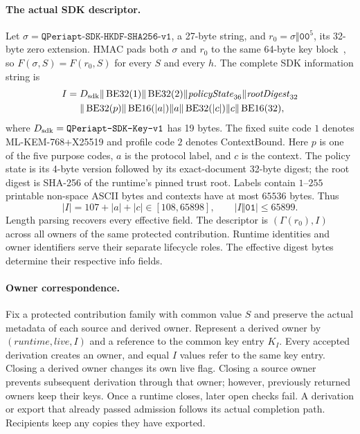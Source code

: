 \documentclass[pdflatex]{sn-jnl}
\theoremstyle{thmstyleone}
\theoremstyle{thmstylethree}
\theoremstyle{thmstyletwo}
\begin{document}
\paragraph{The actual SDK descriptor.}
Let $\sigma=\texttt{QPeriapt-SDK-HKDF-SHA256-v1}$, a 27-byte string, and
$r_0=\sigma\Vert\mathtt{00}^5$, its 32-byte zero extension. HMAC pads both $\sigma$ and $r_0$ to the same
64-byte key block~\cite{rfc2104}, so $F(\sigma,S)=F(r_0,S)$ for every $S$ and every $h$.
The complete SDK information string is
\begin{equation}
\begin{split}
 I={}&D_{\rm sdk}\Vert\operatorname{BE32}(1)
 \Vert\operatorname{BE32}(2)\Vert\mathit{policyState}_{36}
 \Vert\mathit{rootDigest}_{32}\\
 &\Vert\operatorname{BE32}(p)
 \Vert\operatorname{BE16}(|a|)\Vert a
 \Vert\operatorname{BE32}(|c|)\Vert c
 \Vert\operatorname{BE16}(32),
\end{split}
 \label{eq:sdk-purpose-info}
\end{equation}
where $D_{\rm sdk}=\texttt{QPeriapt-SDK-Key-v1}$ has 19 bytes. The fixed
suite code $1$ denotes ML-KEM-768+X25519 and profile code $2$ denotes
ContextBound. Here $p$ is one
of the five purpose codes, $a$ is the protocol label, and $c$ is the context.
The policy state is its 4-byte version followed by its exact-document
32-byte digest; the root digest is SHA-256 of the runtime's pinned trust
root. Labels contain $1$--$255$ printable non-space ASCII bytes and contexts
have at most $65536$ bytes. Thus
\[
 |I|=107+|a|+|c|\in[108,65898],\qquad |I\Vert\mathtt{01}|\le65899.
\]
Length parsing recovers every effective field. The descriptor is
$(\Gamma(r_0),I)$ across all owners of the same protected contribution.
Runtime identities and owner identifiers serve their separate lifecycle
roles. The effective digest bytes determine their respective info fields.

\paragraph{Owner correspondence.}
Fix a protected contribution family with common value $S$ and preserve the
actual metadata of each source and derived owner. Represent a derived owner
by $(\mathit{runtime},\mathit{live},I)$ and a reference to the common key
entry $K_I$. Every accepted derivation creates an owner, and equal $I$ values refer
to the same key entry. Closing a derived owner changes its own live
flag. Closing a source owner prevents subsequent derivation through
that owner; however, previously returned owners keep their keys. Once a
runtime closes, later open checks fail. A derivation or export that
already passed admission follows its actual completion path. Recipients
keep any copies they have exported.
\end{document}
